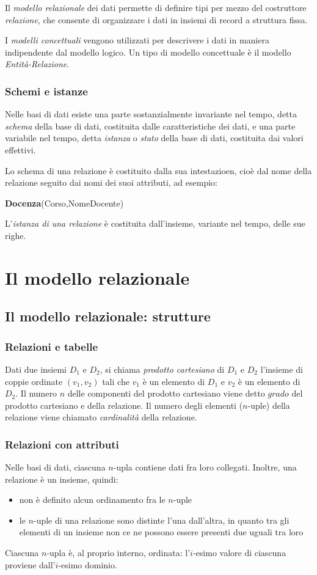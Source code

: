 \documentclass[11pt]{book}
\begin{document}
Il \textit{modello relazionale} dei dati permette di definire tipi per mezzo del costruttore \textit{relazione}, che 
consente di organizzare i dati in insiemi di record a struttura fissa.

I \textit{modelli concettuali} vengono utilizzati per descrivere i dati in maniera indipendente dal modello logico. Un 
tipo di modello concettuale è il modello \textit{Entità-Relazione}.
\subsection{Schemi e istanze}
Nelle basi di dati esiste una parte sostanzialmente invariante nel tempo, detta \textit{schema} della base di dati, 
costituita dalle caratteristiche dei dati, e una parte variabile nel tempo, detta \textit{istanza} o \textit{stato} della 
base di dati, costituita dai valori effettivi.

Lo schema di una relazione è costituito dalla sua intestazioen, cioè dal nome della relazione seguito dai nomi dei suoi 
attributi, ad esempio:
\begin{center}
    \textbf{Docenza}(Corso,NomeDocente)
\end{center}
L'\textit{istanza di una relazione} è costituita dall'insieme, variante nel tempo, delle sue righe.
\chapter{Il modello relazionale}
\section{Il modello relazionale: strutture}
\subsection{Relazioni e tabelle}
Dati due insiemi $D_1$ e $D_2$, si chiama \textit{prodotto cartesiano} di $D_1$ e $D_2$ l'insieme di coppie ordinate 
$(v_1,v_2)$ tali che $v_1$ è un elemento di $D_1$ e $v_2$ è un elemento di $D_2$.
Il numero $n$ delle componenti del prodotto cartesiano viene detto $grado$ del prodotto cartesiano e della relazione. Il 
numero degli elementi ($n$-uple) della relazione viene chiamato \textit{cardinalità} della relazione.
\subsection{Relazioni con attributi}
Nelle basi di dati, ciascuna $n$-upla contiene dati fra loro collegati. Inoltre, una relazione è un insieme, quindi:
\begin{itemize}
    \item non è definito alcun ordinamento fra le $n$-uple
    \item le $n$-uple di una relazione sono distinte l'una dall'altra, in quanto tra gli elementi di un insieme non ce ne 
    possono essere presenti due uguali tra loro 
\end{itemize} 
Ciascuna $n$-upla è, al proprio interno, ordinata: l'$i$-esimo valore di ciascuna proviene dall'$i$-esimo dominio.
\end{document}
